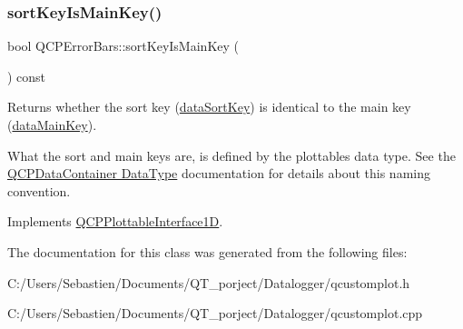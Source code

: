 \subsubsection{\texorpdfstring{sort\+Key\+Is\+Main\+Key()}{sortKeyIsMainKey()}}
{\footnotesize\ttfamily bool Q\+C\+P\+Error\+Bars\+::sort\+Key\+Is\+Main\+Key (\begin{DoxyParamCaption}{ }\end{DoxyParamCaption}) const\hspace{0.3cm}{\ttfamily [virtual]}}

Returns whether the sort key (\hyperlink{class_q_c_p_error_bars_a1ef91328ad7dde84695958139d5f40cf}{data\+Sort\+Key}) is identical to the main key (\hyperlink{class_q_c_p_error_bars_ae3931213f76cd34a824c42c22a1dca74}{data\+Main\+Key}).

What the sort and main keys are, is defined by the plottable\textquotesingle{}s data type. See the \hyperlink{class_q_c_p_data_container_qcpdatacontainer-datatype}{Q\+C\+P\+Data\+Container Data\+Type} documentation for details about this naming convention. 

Implements \hyperlink{class_q_c_p_plottable_interface1_d_a229e65e7ab968dd6cd0e259fa504b79d}{Q\+C\+P\+Plottable\+Interface1D}.



The documentation for this class was generated from the following files\+:\begin{DoxyCompactItemize}
\item 
C\+:/\+Users/\+Sebastien/\+Documents/\+Q\+T\+\_\+porject/\+Datalogger/qcustomplot.\+h\item 
C\+:/\+Users/\+Sebastien/\+Documents/\+Q\+T\+\_\+porject/\+Datalogger/qcustomplot.\+cpp\end{DoxyCompactItemize}
